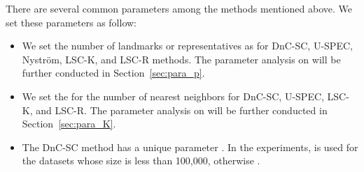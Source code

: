There are several common parameters among the methods mentioned above. We set these parameters as follow:
\begin{itemize}
  \item We set the number of landmarks or representatives as  for DnC-SC, U-SPEC, Nystr\"{o}m, LSC-K, and LSC-R methods. The parameter analysis on  will be further conducted in Section~\ref{sec:para_p}.
  \item We set the  for the number of nearest neighbors for DnC-SC, U-SPEC, LSC-K, and LSC-R.
        The parameter analysis on  will be further conducted in Section~\ref{sec:para_K}.
  \item The DnC-SC method has a unique parameter . In the experiments,  is used for the datasets whose size is less than 100,000, otherwise .
\end{itemize}


